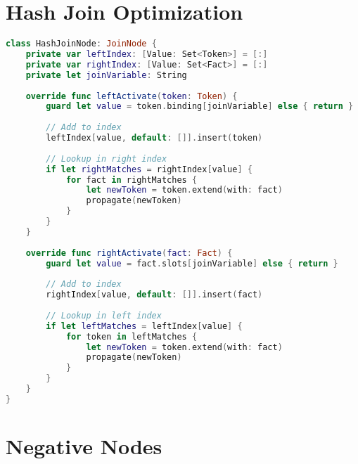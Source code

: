\section{Hash Join Optimization}

\begin{lstlisting}[language=Swift]
class HashJoinNode: JoinNode {
    private var leftIndex: [Value: Set<Token>] = [:]
    private var rightIndex: [Value: Set<Fact>] = [:]
    private let joinVariable: String
    
    override func leftActivate(token: Token) {
        guard let value = token.binding[joinVariable] else { return }
        
        // Add to index
        leftIndex[value, default: []].insert(token)
        
        // Lookup in right index
        if let rightMatches = rightIndex[value] {
            for fact in rightMatches {
                let newToken = token.extend(with: fact)
                propagate(newToken)
            }
        }
    }
    
    override func rightActivate(fact: Fact) {
        guard let value = fact.slots[joinVariable] else { return }
        
        // Add to index
        rightIndex[value, default: []].insert(fact)
        
        // Lookup in left index
        if let leftMatches = leftIndex[value] {
            for token in leftMatches {
                let newToken = token.extend(with: fact)
                propagate(newToken)
            }
        }
    }
}
\end{lstlisting}

\section{Negative Nodes}

